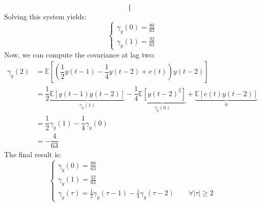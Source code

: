 \begin{enumerate}
\[\begin{cases}
        \end{cases}\]
        Solving this system yields:
        \[\begin{cases}
            \gamma_y(0)=\frac{80}{63} \\ 
            \gamma_y(1)=\frac{32}{63}
        \end{cases}\]
        Now, we can compute the covariance at lag two:
        \begin{align*}
            \gamma_y(2)     &= \mathbb{E}\left[\left(\dfrac{1}{2}y(t-1)-\dfrac{1}{4}y(t-2)+e(t)\right)y(t-2)\right] \\
                            &= \dfrac{1}{2}\underbrace{\mathbb{E}\left[y(t-1)y(t-2)\right]}_{\gamma_y(1)} -\dfrac{1}{4}\underbrace{\mathbb{E}\left[y(t-2)^2\right]}_{\gamma_y(0)} +\underbrace{\mathbb{E}\left[e(t)y(t-2)\right]}_0  \\
                            &= \dfrac{1}{2}\gamma_y(1) -\dfrac{1}{4}\gamma_y(0) \\
                            &= -\dfrac{4}{63}
        \end{align*}
        The final result is:
        \[\begin{cases}
            \gamma_y(0)=\frac{80}{63} \\
            \gamma_y(1)=\frac{32}{63} \\
            \gamma_y(\tau)=\frac{1}{2}\gamma_y(\tau-1)-\frac{1}{4}\gamma_y(\tau-2) \qquad \forall\left\lvert \tau\right\rvert \geq 2
        \end{cases}\]
\end{enumerate}